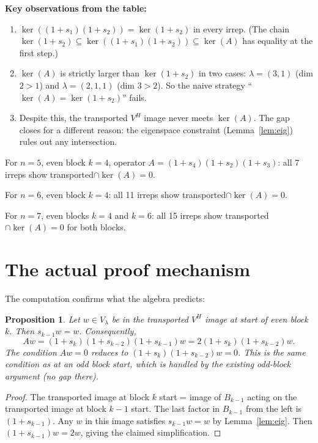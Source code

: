 \documentclass[12pt]{article}
\newtheorem{proposition}[theorem]{Proposition}
\theoremstyle{definition}
\begin{document}
\noindent\textbf{Key observations from the table:}
\begin{enumerate}
\item $\ker((1+s_1)(1+s_2)) = \ker(1+s_2)$ in every irrep. (The chain
  $\ker(1+s_2) \subseteq \ker((1+s_1)(1+s_2)) \subseteq \ker(A)$ has equality at the first step.)
\item $\ker(A)$ is strictly larger than $\ker(1+s_2)$ in two cases: $\lambda = (3,1)$
  (dim $2 > 1$) and $\lambda = (2,1,1)$ (dim $3 > 2$). So the naive strategy
  ``$\ker(A) = \ker(1+s_2)$'' fails.
\item Despite this, the transported $V^H$ image never meets $\ker(A)$.
  The gap closes for a different reason: the eigenspace constraint
  (Lemma~\ref{lem:eig}) rules out any intersection.
\end{enumerate}

For $n = 5$, even block $k = 4$, operator $A = (1+s_4)(1+s_2)(1+s_3)$:
all 7 irreps show transported$\cap\ker(A) = 0$.

For $n = 6$, even block $k = 4$:
all 11 irreps show transported$\cap\ker(A) = 0$.

For $n = 7$, even blocks $k = 4$ and $k = 6$:
all 15 irreps show transported$\cap\ker(A) = 0$ for both blocks.

\section{The actual proof mechanism}

The computation confirms what the algebra predicts:

\begin{proposition}\label{prop:mechanism}
Let $w \in V_\lambda$ be in the transported $V^H$ image at start of even block $k$.
Then $s_{k-1} w = w$. Consequently,
\[
  Aw = (1+s_k)(1+s_{k-2})(1+s_{k-1}) w = 2(1+s_k)(1+s_{k-2}) w.
\]
The condition $Aw = 0$ reduces to $(1+s_k)(1+s_{k-2}) w = 0$.
This is the same condition as at an \emph{odd} block start, which is handled by
the existing odd-block argument (no gap there).
\end{proposition}

\begin{proof}
The transported image at block $k$ start = image of $B_{k-1}$ acting on the
transported image at block $k-1$ start. The last factor in $B_{k-1}$ from the left
is $(1+s_{k-1})$. Any $w$ in this image satisfies $s_{k-1} w = w$ by
Lemma~\ref{lem:eig}. Then $(1+s_{k-1})w = 2w$, giving the claimed simplification.
\end{proof}
\end{document}
